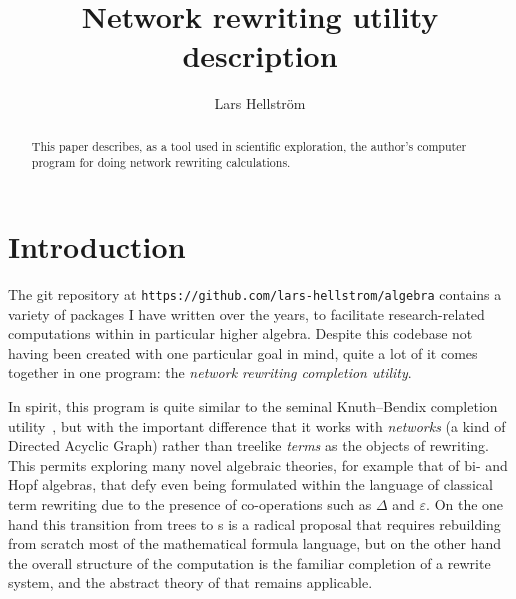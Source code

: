 \documentclass{article}
\theoremstyle{definition}
\providecommand{\url}[1]{\texttt{#1}}
\begin{document}
\title{Network rewriting utility description}
\author{Lars Hellstr\"om}

\maketitle

\begin{abstract}
  This paper describes, as a tool used in scientific exploration, 
  the author's computer program for doing network rewriting 
  calculations.
\end{abstract}


\section{Introduction}
\label{Sec:Introduction}

The git repository at \url{https://github.com/lars-hellstrom/algebra} 
contains a variety of packages I have written over the years, to 
facilitate research-related computations within in particular higher 
algebra. Despite this codebase not having been created with one 
particular goal in mind, quite a lot of it comes together in one 
program: the \emph{network rewriting completion utility}.

In spirit, this program is quite similar to the seminal 
Knuth--Bendix completion utility~\cite{KnuthBendix}, but with the 
important difference that it works with \emph{networks} (a kind of 
Directed Acyclic Graph) rather than treelike \emph{terms} as the 
objects of rewriting. This permits exploring many novel algebraic 
theories, for example that of bi- and Hopf algebras, that defy even 
being formulated within the language of classical term rewriting due 
to the presence of co-operations such as $\Delta$ and $\varepsilon$. 
On the one hand this transition from trees to s is a 
radical proposal that requires rebuilding from scratch most of the 
mathematical formula language, but on the other hand the overall 
structure of the computation is the familiar completion of a rewrite 
system, and the abstract theory of that remains applicable.
\end{document}
